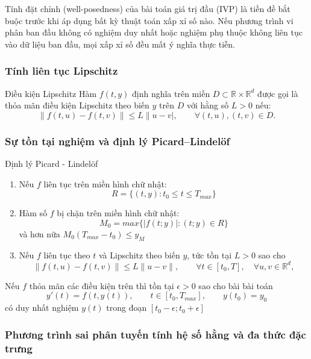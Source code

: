Tính đặt chỉnh (well-posedness) của bài toán giá trị đầu (IVP) là tiền đề bắt buộc trước khi áp dụng bất kỳ thuật toán xấp xỉ số nào. Nếu phương trình vi phân ban đầu không có nghiệm duy nhất hoặc nghiệm phụ thuộc không liên tục vào dữ liệu ban đầu, mọi xấp xỉ số đều mất ý nghĩa thực tiễn.

\subsubsection{Tính liên tục Lipschitz}

\begin{baitapbox}{Điều kiện Lipschitz}
Hàm $f(t, y)$ định nghĩa trên miền $D \subset \mathbb{R} \times \mathbb{R}^d$ được gọi là thỏa mãn điều kiện Lipschitz theo biến $y$ trên $D$ với hằng số $L > 0$ nếu:
\[
    \|f(t, u) - f(t, v)\| \le L\|u - v|, \qquad \forall (t, u), (t, v) \in D.
\]
\end{baitapbox}

\subsubsection{Sự tồn tại nghiệm và định lý Picard--Lindelöf}

\begin{baitapbox}{Định lý Picard - Lindelöf}
    \begin{enumerate}
        \item Nếu $f$ liên tục trên miền hình chữ nhật:
        \[
        R = \{(t,y): t_0 \le t \le T_{max}\}
        \]
        \item Hàm số $f$ bị chặn trên miền hình chữ nhật:
        \[
        M_0 =max\{|f(t;y)|:(t;y) \in R\}
        \]
        và hơn nữa $M_0(T_{max} - t_0) \le y_M$
        \item Nếu $f$ liên tục theo $t$ và Lipschitz theo biến $y$, tức tồn tại $L > 0$ sao cho
        \[
        \|f(t, u) - f(t, v)\| \le L\|u - v\|, \qquad \forall t \in [t_0, T], \quad \forall u, v \in \mathbb{R}^d,
        \]
    \end{enumerate}
   
    Nếu $f$ thỏa mãn các điều kiện trên thì tồn tại $\epsilon > 0$ sao cho bài bài toán
    \[
    y'(t) = f(t, y(t)), \qquad t \in [t_0, T_{max}], \qquad y(t_0) = y_0
    \]
    có duy nhất nghiệm $y(t)$ trong đoạn $[t_0-\epsilon;t_0+\epsilon]$
\end{baitapbox}

\subsubsection{Phương trình sai phân tuyến tính hệ số hằng và đa thức đặc trưng}

